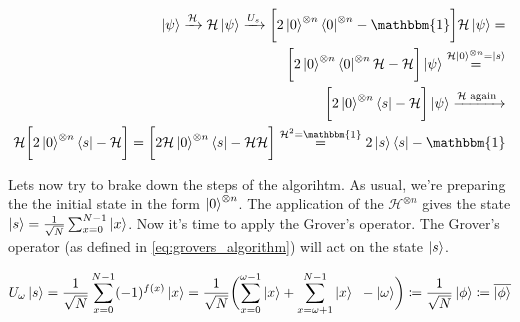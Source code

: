 \begin{equation}
  \begin{split}
    \ket{\psi}\xrightarrow{\mathcal{H}} \mathcal{H}\ket{\psi} \xrightarrow{U_s} \biggl[2\ket{0}^{\otimes n}\bra{0}^{\otimes n} -\mathbbm{1}\biggr] \mathcal{H}\ket{\psi} = \\
    \biggl[2\ket{0}^{\otimes n}\bra{0}^{\otimes n}\mathcal{H} - \mathcal{H}\biggr] \ket{\psi} \stackrel{\mathcal{H}\ket{0}^{\otimes n}=\ket{s}}{=} \\
    \biggl[2\ket{0}^{\otimes n}\bra{s} - \mathcal{H}\biggr] \ket{\psi} \xrightarrow{\mathcal{H}\text{ again }} \\
    \mathcal{H} \biggl[2\ket{0}^{\otimes n}\bra{s} - \mathcal{H}\biggr] = \biggl[2\mathcal{H}\ket{0}^{\otimes n}\bra{s} - \mathcal{H}\mathcal{H}\biggr] \stackrel{\mathcal{H}^2=\mathbbm{1}}{=}
    2\ket{s}\bra{s}-\mathbbm{1}
\end{split}
\end{equation}

Lets now try to brake down the steps of the algorihtm. As usual, we're preparing the the initial state in the form $\ket{0}^{\otimes n}$. 
The application of the $\mathcal{H}^{\otimes n}$ gives the state $\ket{s} = \frac{1}{\sqrt{N}}\sum_{x=0}^{N-1} \ket{x}$.
Now it's time to apply the Grover's operator. The Grover's operator (as defined in \autoref{eq:grovers_algorithm}) will act on the state $\ket{s}$.

\begin{gather}
  U_\omega \ket{s} = \frac{1}{\sqrt{N}}\sum_{x=0}^{N-1} (-1)^{f(x)}\ket{x} = \frac{1}{\sqrt{N}}\biggl(\sum_{x=0}^{\omega - 1} \ket{x}  
  + \sum_{x=\omega+1}^{N-1} \ket{x} \; \; - \ket{\omega} \biggr) \coloneqq \frac{1}{\sqrt{N}}\ket{\phi} \coloneqq \overline{\ket{\phi}}
  \label{eq:grovers_application}
\end{gather}







